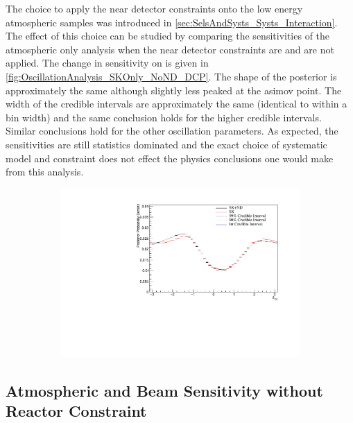 The choice to apply the near detector constraints onto the low energy atmospheric samples was introduced in \autoref{sec:SelsAndSysts_Systs_Interaction}. The effect of this choice can be studied by comparing the sensitivities of the atmospheric only analysis when the near detector constraints are and are not applied. The change in sensitivity on \dcp is given in \autoref{fig:OscillationAnalysis_SKOnly_NoND_DCP}. The shape of the posterior is approximately the same although slightly less peaked at the asimov point. The width of the \quickmath{1\sigma} credible intervals are approximately the same (identical to within a bin width) and the same conclusion holds for the higher credible intervals. Similar conclusions hold for the other oscillation parameters. As expected, the sensitivities are still statistics dominated and the exact choice of systematic model and constraint does not effect the physics conclusions one would make from this analysis.

\begin{figure}[h]
  \begin{subfigure}[t]{1.0\textwidth}
    \includegraphics[width=\textwidth, trim={0mm 0mm 0mm 0mm}, clip,page=1]{Figures/OA/SKOnlyFit_noND/ContourComparison_1D_dcp_BH_0_woRC_UnSmeared_CredibleInterval.pdf}
  \end{subfigure}
  \caption{}
  \label{fig:OscillationAnalysis_SKOnly_NoND_DCP}
\end{figure}

\subsection{Atmospheric and Beam Sensitivity without Reactor Constraint}
\label{sec:OscillationAnalysis_JointFit}

